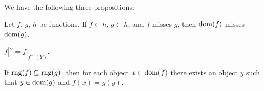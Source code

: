 \documentclass{article}
\begin{document}
We have the following three propositions:
\begin{thm}
\item\label{funct1:112} Let $f$, $g$, $h$ be functions. If $f\subset h$,
  $g\subset h$, and $f$ misses $g$, then $\operatorname{dom}(f)$ misses $\operatorname{dom}(g)$.
\item\label{funct1:113} $f|^{Y}=f|_{f^{-1}(Y)}$.
\item\label{funct1:114} If $\operatorname{rng}(f)\subseteq\operatorname{rng}(g)$, then for each object
  $x\in\operatorname{dom}(f)$ there exists an object $y$ such that $y\in\operatorname{dom}(g)$ and $f(x)=g(y)$.
\end{thm}
\end{document}

